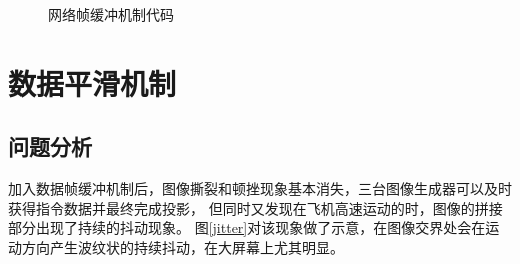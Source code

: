 \begin{figure}[h!]
    \centering
     
    \caption{网络帧缓冲机制代码}
    \label{framebuf}
\end{figure}
\vspace{15pt}
\section{数据平滑机制}
\subsection{问题分析}
加入数据帧缓冲机制后，图像撕裂和顿挫现象基本消失，三台图像生成器可以及时获得指令数据并最终完成投影，
但同时又发现在飞机高速运动的时，图像的拼接部分出现了持续的抖动现象。
图\ref{jitter}对该现象做了示意，在图像交界处会在运动方向产生波纹状的持续抖动，在大屏幕上尤其明显。

